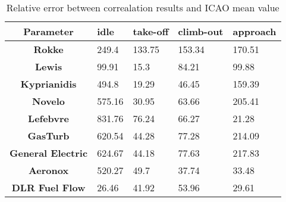 \begin{table}[h!]
  \centering
  \begin{tabularx}{\textwidth}{||c|X|X|X|X||}
  \hline
    \cellcolor{gray!20}\textbf{Parameter} & \cellcolor{gray!20}\textbf{idle} & \cellcolor{gray!20}\textbf{take-off} & \cellcolor{gray!20}\textbf{climb-out} & \cellcolor{gray!20}\textbf{approach} \\ [0.5ex]
  \hline\hline
\centering
    \cellcolor{gray!20}\textbf{Rokke} & 249.4 & 133.75 & 153.34 & 170.51 \\
  \hline
    \cellcolor{gray!20}\textbf{Lewis} & 99.91 & 15.3 & 84.21 & 99.88 \\
  \hline
    \cellcolor{gray!20}\textbf{Kyprianidis} & 494.8 & 19.29 & 46.45 & 159.39 \\
  \hline
    \cellcolor{gray!20}\textbf{Novelo} & 575.16 & 30.95 & 63.66 & 205.41 \\
  \hline
    \cellcolor{gray!20}\textbf{Lefebvre} & 831.76 & 76.24 & 66.27 & 21.28 \\
  \hline
    \cellcolor{gray!20}\textbf{GasTurb} & 620.54 & 44.28 & 77.28 & 214.09 \\
  \hline
    \cellcolor{gray!20}\textbf{General Electric} & 624.67 & 44.18 & 77.63 & 217.83 \\
  \hline
    \cellcolor{gray!20}\textbf{Aeronox} & 520.27 & 49.7 & 37.74 & 33.48 \\
  \hline
    \cellcolor{gray!20}\textbf{DLR Fuel Flow} & 26.46 & 41.92 & 53.96 & 29.61 \\
  \hline
  \end{tabularx}
  \caption{Relative error between correalation results and ICAO mean value}
  \label{tab:relec}
\end{table}
